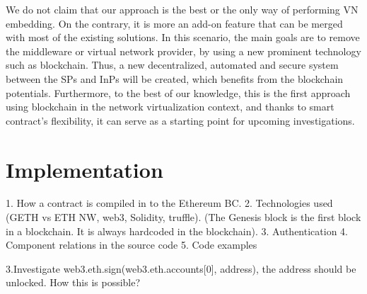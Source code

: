 We do not claim that our approach is the best or the only way
of performing VN embedding. On the contrary, it is more an add-on feature that can be merged with most of the existing solutions. In this scenario, the main goals are to remove the middleware or virtual network provider, by using a new prominent technology such as blockchain. Thus, a new decentralized, automated and secure system between the SPs and InPs will be created, which benefits from the blockchain potentials. Furthermore, to the best of our knowledge, this is the first approach using blockchain in the network virtualization context, and thanks to smart contract's flexibility, it can serve as a starting point for upcoming investigations.


\chapter{Implementation}

1. How a contract is compiled in to the Ethereum BC.
2. Technologies used (GETH vs ETH NW, web3, Solidity, truffle).
(The Genesis block is the first block in a blockchain. It is always hardcoded in the blockchain).
3. Authentication 
4. Component relations in the source code
5. Code examples

3.Investigate web3.eth.sign(web3.eth.accounts[0], address), the address should be unlocked. How this is possible?

\label{ch:implementation}



